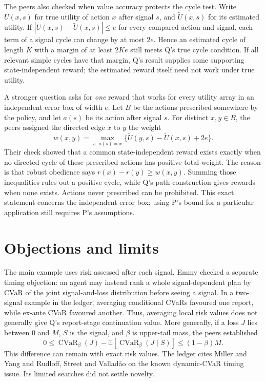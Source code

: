 \documentclass{article}
\begin{document}
The peers also checked when value accuracy protects the cycle test. Write \(U(x,s)\) for true utility of
action \(x\) after signal \(s\), and \(\widetilde U(x,s)\) for its estimated utility. If \(|U(x,s)-\widetilde
U(x,s)|\leq e\) for every compared action and signal, each term of a signal cycle can change by at most
\(2e\). Hence an estimated cycle of length \(K\) with a margin of at least \(2Ke\) still meets Q's true cycle
condition. If all relevant simple cycles have that margin, Q's result supplies some supporting
state-independent reward; the estimated reward itself need not work under true utility.

A stronger question asks for \emph{one} reward that works for every utility array in an independent error box
of width \(e\). Let \(B\) be the actions prescribed somewhere by the policy, and let \(a(s)\) be its action
after signal \(s\). For distinct \(x,y\in B\), the peers assigned the directed edge \(x\) to \(y\) the weight
\[
w(x,y)=\max_{s:\,a(s)=x}\bigl\{\widetilde U(y,s)-\widetilde U(x,s)+2e\bigr\}.
\]
Their check showed that a common state-independent reward exists exactly when no directed cycle of these
prescribed actions has positive total weight. The reason is that robust obedience says \(r(x)-r(y)\geq
w(x,y)\). Summing those inequalities rules out a positive cycle, while Q's path construction gives rewards
when none exists. Actions never prescribed can be prohibited. This exact statement concerns the independent
error box; using P's bound for a particular application still requires P's assumptions.

\section{Objections and limits}

The main example uses risk assessed after each signal. Emmy checked a separate timing objection: an agent may
instead rank a whole signal-dependent plan by CVaR of the joint signal-and-loss distribution before seeing a
signal. In a two-signal example in the ledger, averaging conditional CVaRs favoured one report, while ex-ante
CVaR favoured another. Thus, averaging local risk values does not generally give Q's report-stage continuation
value. More generally, if a loss \(J\) lies between \(0\) and \(M\), \(S\) is the signal, and \(\beta\) is
upper-tail mass, the peers established
\[
0\leq \operatorname{CVaR}_{\beta}(J)
-\mathbb E\!\left[\operatorname{CVaR}_{\beta}(J\mid S)\right]
\leq (1-\beta)M.
\]
This difference can remain with exact risk values. The ledger cites Miller and Yang \cite{MillerYang} and
Rudloff, Street and Vallad\~ao \cite{RudloffStreetValladao} on the known dynamic-CVaR timing issue. Its
limited searches did not settle novelty.
\end{document}
